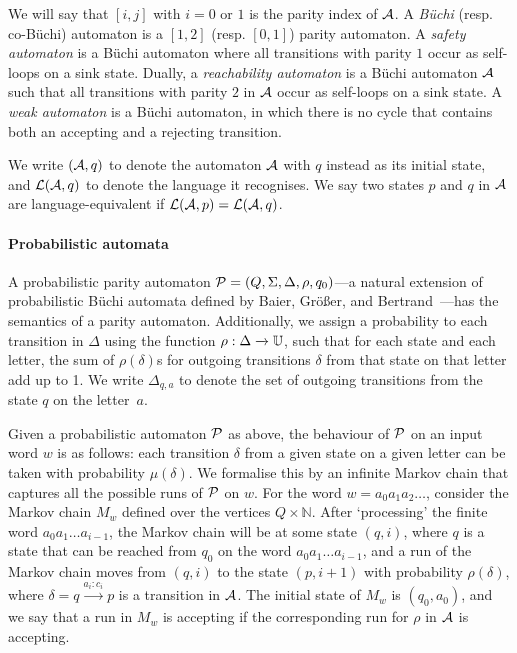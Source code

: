 We will say that $[i,j]$ with $i=0$ or $1$ is the parity index of $\mathcal{A}$. A \emph{B\"uchi} (resp. co-B\"uchi) automaton is a $[1,2]$ (resp. $[0,1]$) parity automaton. A \emph{safety automaton} is a B\"uchi automaton where all  transitions with parity $1$ occur as self-loops on a sink state. Dually, a \emph{reachability automaton} is a B\"uchi automaton $\mathcal{A}$ such that all transitions with parity $2$ in $\mathcal{A}$ occur as self-loops on a sink state. A \emph{weak automaton} is a B\"uchi automaton, in which there is no cycle that contains both an accepting and a rejecting transition.

We write $(\mathcal{A},q)$ to denote the automaton $\mathcal{A}$ with $q$ instead as its initial state, and $\mathcal{L}(\mathcal{A},q)$ to denote the language it recognises. We say two states $p$ and $q$ in $\mathcal{A}$ are language-equivalent if $\mathcal{L}(\mathcal{A},p) = \mathcal{L}(\mathcal{A},q)$.

\paragraph*{Probabilistic automata}
A probabilistic parity automaton $\mathcal{P} = (Q,\Sigma,\Delta,\rho,q_0)$---a natural extension of probabilistic B\"uchi automata defined by Baier, Gr\"o\ss er, and Bertrand~\cite{BGB12}---has the semantics of a parity automaton. Additionally, we assign a probability to each transition in $\Delta$ using the function $\rho: \Delta \xrightarrow{} \mathbb{U}$, such that for each state and each letter, the sum of $\rho(\delta)$s for outgoing transitions $\delta$ from that state on that letter add up to 1. We write $\Delta_{q,a}$ to denote the set of outgoing transitions from  the state $q$ on the letter~$a$.

Given a probabilistic automaton $\mathcal{P}$ as above, the behaviour of $\mathcal{P}$ on an input word $w$ is as follows: each transition $\delta$ from a given state on a given letter can be taken with probability $\mu(\delta)$. We formalise this by an infinite Markov chain that captures all the possible runs of $\mathcal{P}$ on $w$. For the word $w=a_0 a_1 a_2 \dots$, consider the Markov chain $M_w$ defined over the vertices $Q \times \mathbb{N}$. After `processing' the finite word $a_0 a_1 \dots a_{i-1}$, the Markov chain will be at some state $(q,i)$, where $q$ is a state that can be reached from $q_0$ on the word $a_0 a_1 \dots a_{i-1}$, and a run of the Markov chain moves from $(q,i)$ to the state $(p,i+1)$ with probability $\rho(\delta)$, where $\delta=q\xrightarrow{a_i:c_i}p$ is a transition in $\mathcal{A}$. The initial state of $M_w$ is $(q_0,a_0)$, and  we say that a run in $M_w$ is accepting if the corresponding run for $\rho$ in $\mathcal{A}$ is accepting.

